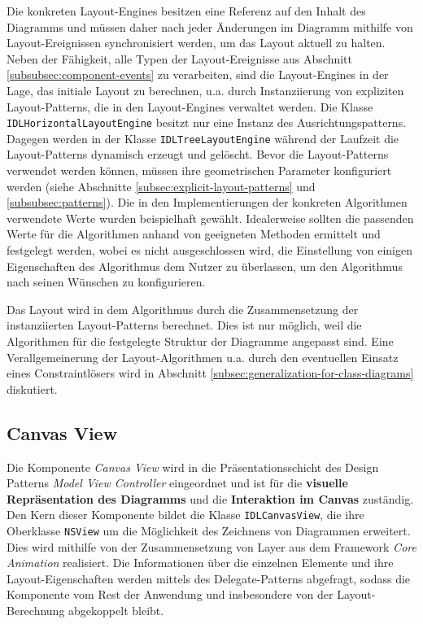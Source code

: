 Die konkreten Layout-Engines besitzen eine Referenz auf den Inhalt des Diagramms und müssen daher nach jeder Änderungen im Diagramm mithilfe von Layout-Ereignissen synchronisiert werden, um das Layout aktuell zu halten. Neben der Fähigkeit, alle Typen der Layout-Ereignisse aus Abschnitt \ref{subsubsec:component-events} zu verarbeiten, sind die Layout-Engines in der Lage, das initiale Layout zu berechnen, u.a. durch Instanziierung von expliziten Layout-Patterns, die in den Layout-Engines verwaltet werden. Die Klasse \texttt{IDLHorizontalLayoutEngine} besitzt nur eine Instanz des Ausrichtungspatterns. Dagegen werden in der Klasse \texttt{IDLTreeLayoutEngine} während der Laufzeit die Layout-Patterns dynamisch erzeugt und gelöscht. Bevor die Layout-Patterns verwendet werden können, müssen ihre geometrischen Parameter konfiguriert werden (siehe Abschnitte \ref{subsec:explicit-layout-patterns} und \ref{subsubsec:patterns}). Die in den Implementierungen der konkreten Algorithmen verwendete Werte wurden beispielhaft gewählt. Idealerweise sollten die passenden Werte für die Algorithmen anhand von geeigneten Methoden ermittelt und festgelegt werden, wobei es nicht ausgeschlossen wird, die Einstellung von einigen Eigenschaften des Algorithmus dem Nutzer zu überlassen, um den Algorithmus nach seinen Wünschen zu konfigurieren.

Das Layout wird in dem Algorithmus durch die Zusammensetzung der instanziierten Layout-Patterns berechnet. Dies ist nur möglich, weil die Algorithmen für die festgelegte Struktur der Diagramme angepasst sind. Eine Verallgemeinerung der Layout-Algorithmen u.a. durch den eventuellen Einsatz eines Constraintlösers wird in Abschnitt \ref{subsec:generalization-for-class-diagrams} diskutiert.

\subsection{Canvas View}
\label{subsec:canvas-view}

Die Komponente \textit{Canvas View} wird in die Präsentationsschicht des Design Patterns \textit{Model View Controller} eingeordnet und ist für die \textbf{visuelle Repräsentation des Diagramms} und die \textbf{Interaktion im Canvas} zuständig. Den Kern dieser Komponente bildet die Klasse \texttt{IDLCanvas\-View}, die ihre Oberklasse \texttt{NSView} um die Möglichkeit des Zeichnens von Diagrammen erweitert. Dies wird mithilfe von der Zusammensetzung von Layer aus dem Framework \textit{Core Animation} realisiert. Die Informationen über die einzelnen Elemente und ihre Layout-Eigenschaften werden mittels des Delegate-Patterns abgefragt, sodass die Komponente vom Rest der Anwendung und insbesondere von der Layout-Berechnung abgekoppelt bleibt.

